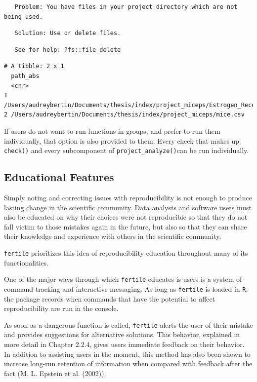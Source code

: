 \documentclass[12pt,twoside]{reedthesis}
\begin{document}
\begin{verbatim}
   Problem: You have files in your project directory which are not being used.
\end{verbatim}
\begin{verbatim}
   Solution: Use or delete files.
\end{verbatim}
\begin{verbatim}
   See for help: ?fs::file_delete
\end{verbatim}
\begin{verbatim}
# A tibble: 2 x 1
  path_abs                                                                      
  <chr>                                                                         
1 /Users/audreybertin/Documents/thesis/index/project_miceps/Estrogen_Receptors.~
2 /Users/audreybertin/Documents/thesis/index/project_miceps/mice.csv            
\end{verbatim}
If users do not want to run functions in groups, and prefer to run them
individually, that option is also provided to them. Every check that
makes up \texttt{check()} and every subcomponent of
\texttt{project\_analyze()}can be run individually.

\subsection{Educational Features}\label{educational-features}

Simply noting and correcting issues with reproducibility is not enough
to produce lasting change in the scientific community. Data analysts and
software users must also be educated on why their choices were not
reproducible so that they do not fall victim to those mistakes again in
the future, but also so that they can share their knowledge and
experience with others in the scientific community.

\texttt{fertile} prioritizes this idea of reproducibility education
throughout many of its functionalities.

One of the major ways through which \texttt{fertile} educates is users
is a system of command tracking and interactive messaging. As long as
\texttt{fertile} is loaded in \texttt{R}, the package records when
commands that have the potential to affect reproducibility are run in
the console.

As soon as a dangerous function is called, \texttt{fertile} alerts the
user of their mistake and provides suggestions for alternative
solutions. This behavior, explained in more detail in Chapter 2.2.4,
gives users immediate feedback on their behavior. In addition to
assisting users in the moment, this method has also been shown to
increase long-run retention of information when compared with feedback
after the fact (M. L. Epstein et al. (2002)).
\end{document}

